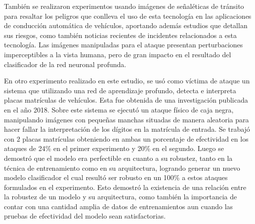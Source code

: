 También se realizaron experimentos usando imágenes de señaléticas de tránsito para resaltar los peligros que conlleva el uso de esta tecnología en las aplicaciones de conducción automática de vehículos, aportando además estudios que detallan sus riesgos, como también noticias recientes de incidentes relacionados a esta tecnología. Las imágenes manipuladas para el ataque presentan perturbaciones imperceptibles a la vista humana, pero de gran impacto en el resultado del clasificador de la red neuronal profunda.

En otro experimento realizado en este estudio, se usó como víctima de ataque un sistema que utilizando una red de aprendizaje profundo, detecta e interpreta placas matrículas de vehículos. Esta fue obtenida de una investigación publicada en el año 2018. Sobre este sistema se ejecutó un ataque físico de caja negra, manipulando imágenes con pequeñas manchas situadas de manera aleatoria para hacer fallar la interpretación de los dígitos en la matrícula de entrada. Se trabajó con 2 placas matrículas obteniendo en ambas un porcentaje de efectividad en los ataques de 24\% en el primer experimento y 20\% en el segundo. Luego se demostró que el modelo era perfectible en cuanto a su robustez, tanto en la técnica de entrenamiento como en su arquitectura, logrando generar un nuevo modelo clasificador el cual resultó ser robusto en un 100\% a estos ataques formulados en el experimento. Esto demostró la existencia de una relación entre la robustez de un modelo y su arquitectura, como también la importancia de contar con una cantidad amplia de datos de entrenamientos aun cuando las pruebas de efectividad del modelo sean satisfactorias.


